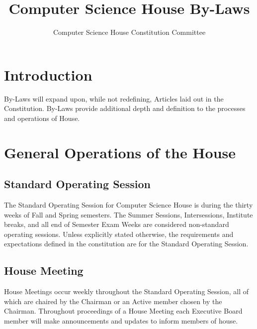 \documentclass{article}
\title{Computer Science House By-Laws}
\author{Computer Science House Constitution Committee}
\date{\datechanged}
\newcommand{\bylaw}[1]{\section{#1} \label{#1}}
\newcommand{\bsection}[1]{\subsection{#1} \label{#1}}
\begin{document}
\maketitle

\bylaw{Introduction}
By-Laws will expand upon, while not redefining, Articles laid out in the Constitution. By-Laws provide additional depth and definition to the processes and operations of House.

\bylaw{General Operations of the House}
\bsection{Standard Operating Session}
The Standard Operating Session for Computer Science House is during the thirty weeks of Fall and Spring semesters. The Summer Sessions, Intersessions, Institute breaks, and all end of Semester Exam Weeks are considered non-standard operating sessions. Unless explicitly stated otherwise, the requirements and expectations deﬁned in the constitution are for the Standard Operating Session.
\bsection{House Meeting}
House Meetings occur weekly throughout the Standard Operating Session, all of which are chaired by the Chairman or an Active member chosen  by the Chairman. Throughout proceedings of a House Meeting each Executive Board member will make announcements and updates to inform members of house.
\end{document}

